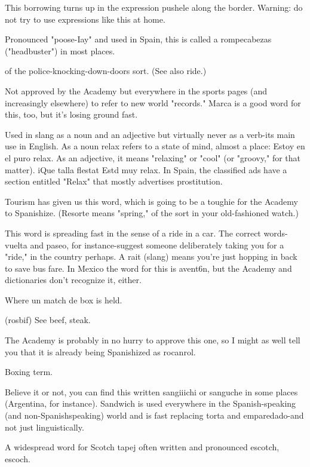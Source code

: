  This borrowing turns up in the expression pushele
along the border. Warning: do not try to use expressions like this
at home.

 Pronounced "poose-Iay" and used in Spain, this is
called a rompecabezas ("headbuster") in most places.

 of the police-knocking-down-doors sort. (See also ride.)

 Not approved by the Academy but everywhere in
the sports pages (and increasingly elsewhere) to refer to new world "records." Marca is a good word for this, too, but it's losing ground fast.

 Used in slang as a noun and an adjective but virtually
never as a verb-its main use in English. As a noun relax refers to a
state of mind, almost a place: Estoy en el puro relax. As an adjective, it
means "relaxing" or "cool" (or "groovy," for that matter). iQue talla
flestat Estd muy relax. In Spain, the classified ads have a section entitled "Relax" that mostly advertises prostitution.

 Tourism has given us this word, which is going to
be a toughie for the Academy to Spanishize. (Resorte means "spring,"
of the sort in your old-fashioned watch.)

 This word is spreading fast in the sense of a ride in a
car. The correct words-vuelta and paseo, for instance-suggest someone deliberately taking you for a "ride," in the country perhaps. A rait
(slang) means you're just hopping in back to save bus fare. In Mexico
the word for this is avent6n, but the Academy and dictionaries don't
recognize it, either.

 Where un match de box is held.

 (rosbif) See beef, steak.

 The Academy is probably in no
hurry to approve this one, so I might as well tell you that it is already being Spanishized as rocanrol.

 Boxing term.

 Believe it or not, you can find this written sangiiichi or sanguche in some places (Argentina, for instance). Sandwich is used everywhere in the Spanish-speaking (and non-Spanishspeaking) world and is fast replacing torta and emparedado-and not
just linguistically.

 A widespread word for Scotch tapej often written
and pronounced escotch, escoch.

